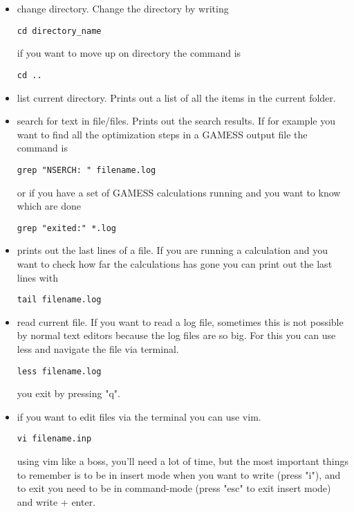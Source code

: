 \documentclass{article}
\begin{document}
\begin{itemize}

    \item {} change directory. Change the directory by writing
\begin{lstlisting}
cd directory_name
\end{lstlisting}

        if you want to move up on directory the command is
\begin{lstlisting}
cd ..
\end{lstlisting}

    \item {} list current directory. Prints out a list of all the items in the current folder.

    \item {} search for text in file/files. Prints out the search results. If for example you want to find all the optimization steps in a GAMESS output file the command is
\begin{lstlisting}
grep "NSERCH: " filename.log
\end{lstlisting}
        or if you have a set of GAMESS calculations running and you want to know which are done
\begin{lstlisting}
grep "exited:" *.log
\end{lstlisting}

    \item {} prints out the last lines of a file. 
        If you are running a calculation and you want to check how far the calculations has gone you can print out the last lines with
\begin{lstlisting}
tail filename.log
\end{lstlisting}

    \item {} read current file. If you want to read a log file, sometimes this is not possible by normal text editors because the log files are so big. For this you can use less and navigate the file via terminal.
\begin{lstlisting}
less filename.log
\end{lstlisting}
    you exit by pressing "q".

    \item {} if you want to edit files via the terminal you can use vim. 
\begin{lstlisting}
vi filename.inp
\end{lstlisting}
using vim like a boss, you'll need a lot of time, but the most important things to remember is to be in insert mode when you want to write (press "i"), and to exit you need to be in command-mode (press "esc" to exit insert mode) and write  + enter.

\end{itemize}
\end{document}
